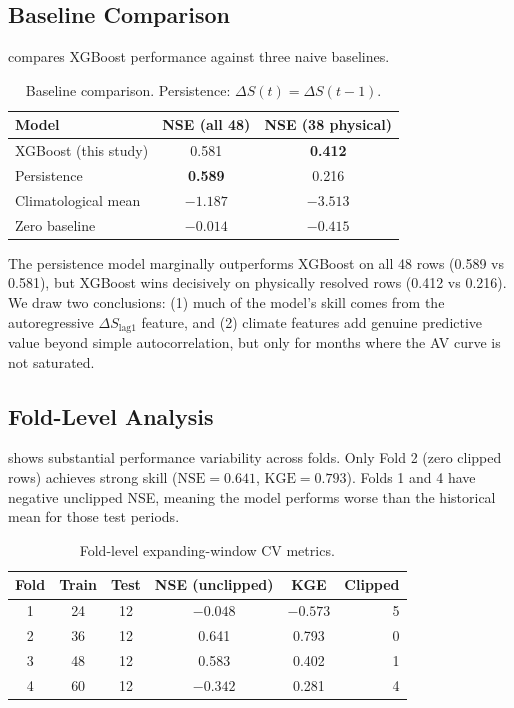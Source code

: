 \documentclass[12pt,a4paper,oneside]{report}
\newcommand{\dS}{\Delta S}
\newcommand{\NSE}{\mathrm{NSE}}
\newcommand{\KGE}{\mathrm{KGE}}
\begin{document}
\subsection{Baseline Comparison}

 compares XGBoost performance against three naive baselines.

\begin{table}[htbp]
  \centering
  \caption{Baseline comparison. Persistence: $\dS(t) = \dS(t{-}1)$.}
  \label{tab:thesis_baselines}
  \begin{tabular}{lcc}
    \toprule
    Model & NSE (all 48) & NSE (38 physical) \\
    \midrule
    XGBoost (this study) & 0.581 & \textbf{0.412} \\
    Persistence & \textbf{0.589} & 0.216 \\
    Climatological mean & $-1.187$ & $-3.513$ \\
    Zero baseline & $-0.014$ & $-0.415$ \\
    \bottomrule
  \end{tabular}
\end{table}

The persistence model marginally outperforms XGBoost on all 48 rows
(0.589 vs 0.581), but XGBoost wins decisively on physically resolved rows
(0.412 vs 0.216). We draw two conclusions: (1) much of the model's skill
comes from the autoregressive $\dS_{\text{lag1}}$ feature, and (2) climate
features add genuine predictive value beyond simple autocorrelation, but
only for months where the AV curve is not saturated.

\subsection{Fold-Level Analysis}

 shows substantial performance variability across
folds. Only Fold 2 (zero clipped rows) achieves strong skill ($\NSE =
0.641$, $\KGE = 0.793$). Folds 1 and 4 have negative unclipped NSE,
meaning the model performs worse than the historical mean for those test
periods.

\begin{table}[htbp]
  \centering
  \caption{Fold-level expanding-window CV metrics.}
  \label{tab:thesis_folds}
  \begin{tabular}{cccccr}
    \toprule
    Fold & Train & Test & NSE (unclipped) & KGE & Clipped \\
    \midrule
    1 & 24 & 12 & $-0.048$ & $-0.573$ & 5 \\
    2 & 36 & 12 & 0.641 & 0.793 & 0 \\
    3 & 48 & 12 & 0.583 & 0.402 & 1 \\
    4 & 60 & 12 & $-0.342$ & 0.281 & 4 \\
    \bottomrule
  \end{tabular}
\end{table}
\end{document}
